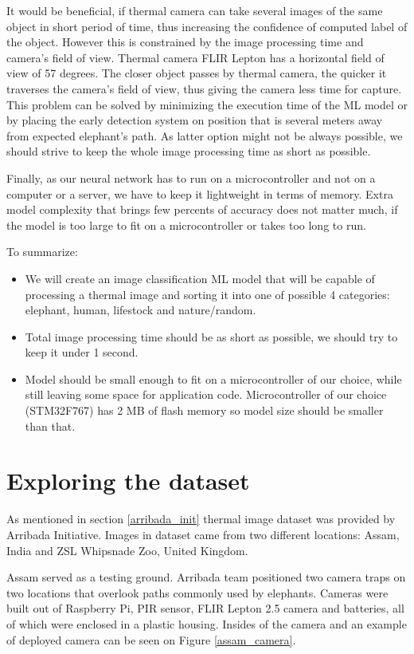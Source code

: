 It would be beneficial, if thermal camera can take several images of the same object in short period of time, thus increasing the confidence of computed label of the object.
However this is constrained by the image processing time and camera's field of view.
Thermal camera FLIR Lepton has a horizontal field of view of 57 degrees.
The closer object passes by thermal camera, the quicker it traverses the camera's field of view, thus giving the camera less time for capture.
This problem can be solved by minimizing the execution time of the ML model or by placing the early detection system on position that is several meters away from expected elephant's path.
As latter option might not be always possible, we should strive to keep the whole image processing time as short as possible.

Finally, as our neural network has to run on a microcontroller and not on a computer or a server, we have to keep it lightweight in terms of memory.
Extra model complexity that brings few percents of accuracy does not matter much, if the model is too large to fit on a microcontroller or takes too long to run.


To summarize:
\begin{itemize}
    \item We will create an image classification ML model that will be capable of processing a thermal image and sorting it into one of possible 4 categories: elephant, human, lifestock and nature/random.
    \item Total image processing time should be as short as possible, we should try to keep it under 1 second.
    \item Model should be small enough to fit on a microcontroller of our choice, while still leaving some space for application code. Microcontroller of our choice (STM32F767) has 2 MB of flash memory so model size should be smaller than that.
\end{itemize}


\section{ Exploring the dataset} \label{exploring_dataset}

As mentioned in section \ref{arribada_init} thermal image dataset was provided by Arribada Initiative\cite{wildlabs-winners}\cite{arribada-assam}.
Images in dataset came from two different locations: Assam, India and ZSL Whipsnade Zoo, United Kingdom.

Assam served as a testing ground.
Arribada team positioned two camera traps on two locations that overlook paths commonly used by elephants.
Cameras were built out of Raspberry Pi, PIR sensor, FLIR Lepton 2.5 camera and batteries, all of which were enclosed in a plastic housing.
Insides of the camera and an example of deployed camera can be seen on Figure \ref{assam_camera}.

